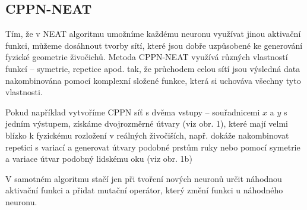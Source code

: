 \documentclass[a4]{article}
\begin{document}
\subsection{CPPN-NEAT}
Tím, že v NEAT algoritmu umožníme každému neuronu využívat jinou aktivační funkci, můžeme dosáhnout tvorby sítí, které jsou dobře uzpůsobené ke generování fyzické geometrie živočichů. Metoda CPPN-NEAT\cite{cppn-neat} využívá různých vlastností funkcí -- symetrie, repetice apod. tak, že průchodem celou sítí jsou výsledná data nakombinována pomocí komplexní složené funkce, která si uchováva všechny tyto vlastnosti.\par
Pokud například vytvoříme CPPN síť s dvěma vstupy -- souřadnicemi $x$ a $y$ s jedním výstupem, získáme dvojrozměrné útvary (viz obr. 1), které mají velmi blízko k fyzickému rozložení v reálných živočiších, např. dokáže nakombinovat repetici s variací a generovat útvary podobné prstům ruky nebo pomocí symetrie a variace útvar podobný lidskému oku (viz obr. 1b)\par
V samotném algoritmu stačí jen při tvoření nových neuronů určit náhodnou aktivační funkci a přidat mutační operátor, který změní funkci u náhodného neuronu.\par
\end{document}
